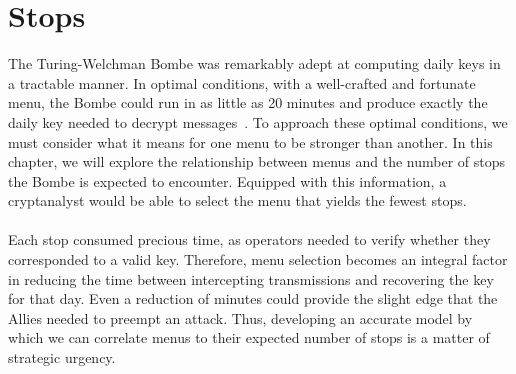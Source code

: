 \chapter{Stops}\label{stops}
The Turing-Welchman Bombe was remarkably adept at computing daily
keys in a tractable manner. In optimal conditions,
with a well-crafted and fortunate menu, the Bombe could run in as
little as 20 minutes and produce exactly the daily key needed to
decrypt messages~\cite[p.~12]{Alexander1945}.
To approach these optimal conditions, we must consider what it means
for one menu to be stronger than another. In this chapter, we will
explore the relationship
between menus and the number of stops the Bombe is expected to
encounter. Equipped with this information, a cryptanalyst would be
able to select the menu
that yields the fewest stops.
\\\\Each stop consumed precious
time, as operators needed to verify whether they corresponded to a
valid key. Therefore, menu selection becomes an integral factor
in reducing the time between intercepting transmissions and
recovering the key for that day. Even a reduction of minutes could
provide the slight edge that the Allies needed to preempt an attack.
Thus, developing an accurate model by which we can correlate menus to
their expected number of stops is a matter of strategic urgency.

